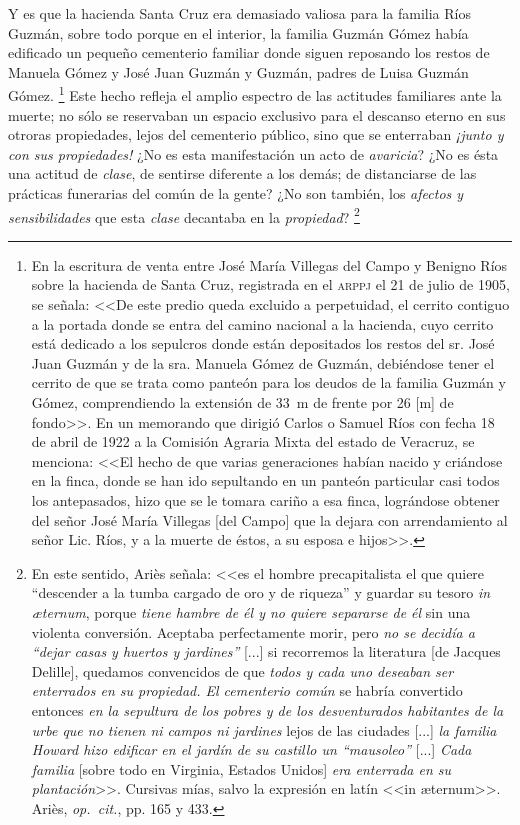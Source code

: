 \documentclass[14pt,twoside,final]{extbook} %
\let\oldfootnote\footnote
\renewcommand\footnote[1]{%
\oldfootnote{\hspace{1mm}#1}}
\begin{document}
Y es que la hacienda Santa Cruz era demasiado valiosa para la familia Ríos Guzmán, sobre todo porque en el interior, la familia Guzmán Gómez había edificado un pequeño cementerio familiar donde siguen reposando los restos de Manuela Gómez y José Juan Guzmán y Guzmán, padres de Luisa Guzmán Gómez.\footnote{En la escritura de venta entre José María Villegas del Campo y Benigno Ríos sobre la hacienda de Santa Cruz, registrada en el \textsc{arppj} el 21 de julio de 1905, se señala: <<De este predio queda excluido a perpetuidad, el cerrito contiguo a la portada donde se entra del camino nacional a la hacienda, cuyo cerrito está dedicado a los sepulcros donde están depositados los restos del sr. José Juan Guzmán y de la sra. Manuela Gómez de Guzmán, debiéndose tener el cerrito de que se trata como panteón para los deudos de la familia Guzmán y Gómez, comprendiendo la extensión de 33~m de frente por 26 [m] de fondo>>. En un memorando que dirigió Carlos o Samuel Ríos con
fecha 18 de abril de 1922 a la Comisión Agraria Mixta del estado de Veracruz, se menciona: <<El hecho de que varias generaciones habían nacido y criándose en la finca, donde se han ido sepultando en un panteón particular casi todos los antepasados, hizo que se le tomara cariño a esa finca, lográndose obtener del señor José María Villegas [del Campo] que la dejara con arrendamiento al señor Lic. Ríos, y a la muerte de éstos, a su esposa e hijos>>.} Este hecho refleja el amplio espectro de las actitudes familiares ante la muerte; no sólo se reservaban un espacio exclusivo para el descanso eterno en sus otroras propiedades, lejos del cementerio público, sino que se enterraban \emph{¡junto y con sus propiedades!} ¿No es esta manifestación un acto de \emph{avaricia}? ¿No es ésta una actitud de \emph{clase}, de sentirse diferente a los demás; de distanciarse de las prácticas funerarias del común de la gente? ¿No son también, los \emph{afectos y sensibilidades} que esta \emph{clase} decantaba en la \emph{propiedad}?\footnote{En este sentido, Ariès señala: <<es el hombre precapitalista el que quiere ``descender a la tumba cargado de oro y de riqueza'' y guardar su tesoro \emph{in \ae ternum}, porque \emph{tiene hambre de él y no quiere separarse de él} sin una violenta conversión. Aceptaba perfectamente morir, pero \emph{no se decidía a ``dejar casas y huertos y jardines''} [...] si recorremos la literatura [de Jacques Delille], quedamos convencidos de que \emph{todos y cada uno deseaban ser enterrados en su propiedad. El cementerio común} se habría convertido entonces \emph{en la sepultura de los pobres y de los desventurados habitantes de la urbe que no tienen ni campos ni jardines} lejos de las ciudades [...] \emph{la familia \emph{Howard} hizo edificar en el jardín de su castillo un ``mausoleo''} [...] \emph{Cada familia} [sobre todo en
Virginia, Estados Unidos] \emph{era enterrada en su plantación}>>. Cursivas mías, salvo la
expresión en latín <<in \ae ternum>>. Ariès, \emph{op.~cit.}, pp. 165 y 433.}
\end{document}

